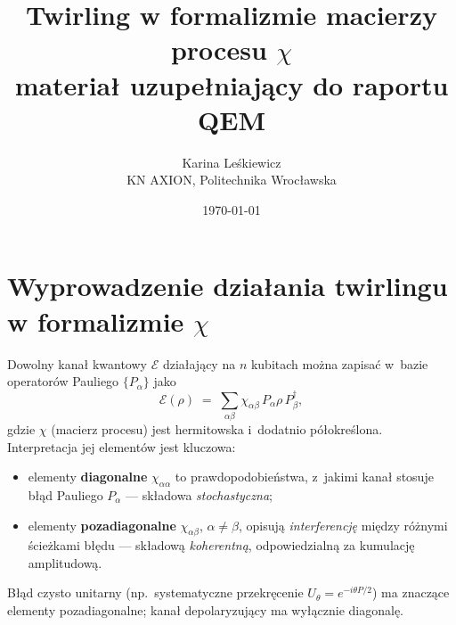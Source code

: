 \documentclass[11pt,a4paper]{article}
\title{Twirling w formalizmie macierzy procesu $\chi$\\
\large materiał uzupełniający do raportu QEM}
\author{Karina Leśkiewicz \\ \small KN AXION, Politechnika Wrocławska}
\date{\today}
\begin{document}
\maketitle
\section*{Wyprowadzenie działania twirlingu w formalizmie $\chi$}

Dowolny kanał kwantowy $\mathcal{E}$ działający na $n$ kubitach można zapisać w~bazie operatorów
Pauliego $\{P_\alpha\}$ jako
\begin{equation}
  \mathcal{E}(\rho) \;=\; \sum_{\alpha\beta} \chi_{\alpha\beta}\, P_\alpha \rho\, P_\beta^{\dagger},
  \label{eq:chi-def}
\end{equation}
gdzie $\chi$ (macierz procesu) jest hermitowska i~dodatnio półokreślona. Interpretacja jej elementów
jest kluczowa:
\begin{itemize}
  \item elementy \textbf{diagonalne} $\chi_{\alpha\alpha}$ to prawdopodobieństwa, z~jakimi kanał
        stosuje błąd Pauliego $P_\alpha$ --- składowa \emph{stochastyczna};
  \item elementy \textbf{pozadiagonalne} $\chi_{\alpha\beta}$, $\alpha\neq\beta$, opisują
        \emph{interferencję} między różnymi ścieżkami błędu --- składową \emph{koherentną},
        odpowiedzialną za kumulację amplitudową.
\end{itemize}
Błąd czysto unitarny (np.\ systematyczne przekręcenie $U_\theta = e^{-i\theta P/2}$) ma znaczące
elementy pozadiagonalne; kanał depolaryzujący ma wyłącznie diagonalę.
\end{document}
